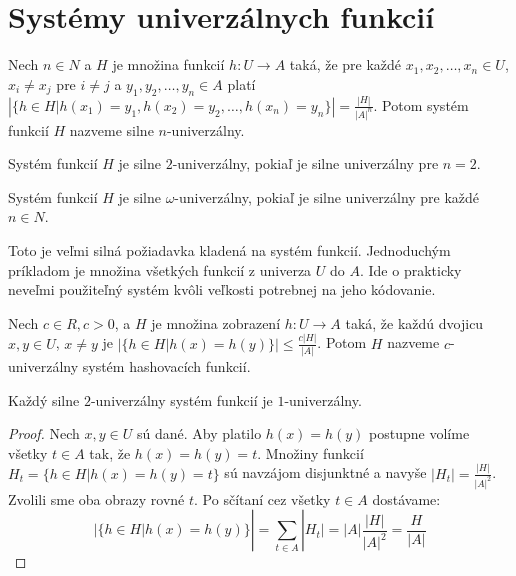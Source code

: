 \chapter{Systémy univerzálnych funkcií}


\begin{definition}
\label{strong_universal_n_system}
Nech $n \in N$ a $H$ je množina funkcií $h: U \rightarrow A$ taká, že pre každé $x_1, x_2, \dots, x_n \in U$, $x_i \neq x_j$ pre $i \neq j$ a $y_1, y_2, \dots, y_n \in A$ platí $\left|\lbrace h \in H | h(x_1) = y_1, h(x_2) = y_2, \dots, h(x_n) = y_n \rbrace \right| = \frac{|H|}{|A|^n}$. Potom systém funkcií $H$ nazveme silne $n$-univerzálny.
\end{definition}

\begin{definition}
\label{strong_universal_2_system}
Systém funkcií $H$ je silne $2$-univerzálny, pokiaľ je silne univerzálny pre $n = 2$.
\end{definition}

\begin{definition}
\label{strong_universal_omega_system}
Systém funkcií $H$ je silne $\omega$-univerzálny, pokiaľ je silne univerzálny pre každé $n \in N$.
\end{definition}

Toto je veľmi silná požiadavka kladená na systém funkcií. Jednoduchým prí\-kladom je množina všetkých funkcií z univerza $U$ do $A$. Ide o prakticky neveľmi použiteľný systém kvôli veľkosti potrebnej na jeho kódovanie. 

\begin{definition}
\label{c_universal_system}
Nech $c \in R, c > 0$, a $H$ je množina zobrazení $h: U \rightarrow A$ taká, že každú dvojicu $x, y \in U$, $x \neq y$ je $\left| \lbrace h \in H | h(x) = h(y) \rbrace \right| \leq \frac {c |H|}{|A|}$. Potom $H$ nazveme $c$-univerzálny systém hashovacích funkcií.
\end{definition}

\begin{remark}
Každý silne $2$-univerzálny systém funkcií je $1$-univerzálny.
\end{remark}
\begin{proof}
Nech $x, y \in U$ sú dané. Aby platilo $h(x) = h(y)$ postupne volíme všetky $t \in A$ tak, že $h(x) = h(y) = t$. Množiny funkcií $H_t = \lbrace h \in H | h(x) = h(y) = t \rbrace$ sú navzájom disjunktné a navyše $|H_t| = \frac{|H|}{{|A|}^{2}}$. Zvolili sme oba obrazy rovné $t$. Po sčítaní cez všetky $t \in A$ dostávame:
\begin{displaymath}
|\lbrace h \in H | h(x) = h(y) \rbrace | = \displaystyle \sum_{t \in A} |H_t| = |A| \frac{|H|}{{|A|}^{2}} = \frac{H}{|A|}
\end{displaymath}
\end{proof}

